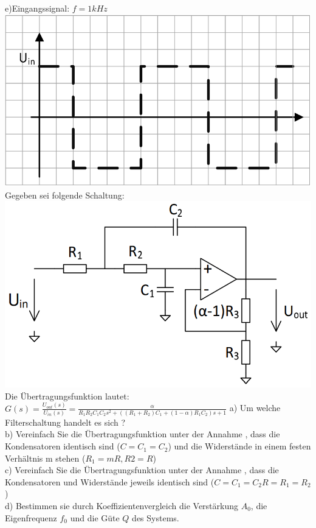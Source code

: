 \documentclass[A4]{scrartcl}
\begin{document}
  e)Eingangssignal: $f=1kHz$\\
  \includegraphics{U_rechteck.png}\\
  Gegeben sei folgende Schaltung:\\
  \includegraphics{Schaltung7.png}\\
  Die Übertragungsfunktion lautet: $G(s) = \frac{U_{out}(s)}{U_{in}(s)} = \frac{\alpha}{R_1R_2C_1C_2s^2+((R_1+R_2)C_1+(1-\alpha)R_1C_2)s+1}$
  a) Um welche Filterschaltung handelt es sich ?\\
  b) Vereinfach Sie die Übertragungsfunktion unter der Annahme , dass die Kondensatoren identisch sind ($C=C_1=C_2$) und die Widerstände in einem festen Verhältnis m stehen ($R_1=mR, R2=R$)\\
  c) Vereinfach Sie die Übertragungsfunktion unter der Annahme , dass die Kondensatoren und Widerstände jeweils identisch sind ($C=C_1=C_2 R=R_1=R_2$)\\
  d) Bestimmen sie durch Koeffizientenvergleich die Verstärkung $A_0$, die Eigenfrequenz $f_0$ und die Güte $Q$ des Systems.\\
\end{document}
